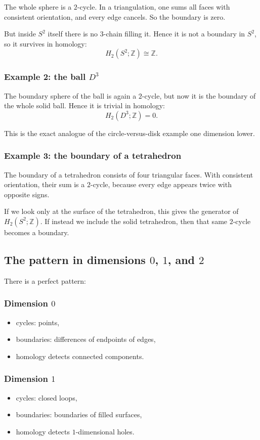 \documentclass[12pt,a4paper]{article}
\newcommand{\Z}{\mathbb{Z}}
\theoremstyle{notespace}
\begin{document}
The whole sphere is a \(2\)-cycle. In a triangulation, one sums all faces with consistent orientation, and every edge cancels. So the boundary is zero.

But inside \(S^2\) itself there is no \(3\)-chain filling it. Hence it is not a boundary in \(S^2\), so it survives in homology:
\[
H_2(S^2;\Z)\cong \Z.
\]

\subsubsection*{Example 2: the ball \(D^3\)}

The boundary sphere of the ball is again a \(2\)-cycle, but now it is the boundary of the whole solid ball. Hence it is trivial in homology:
\[
H_2(D^3;\Z)=0.
\]

This is the exact analogue of the circle-versus-disk example one dimension lower.

\subsubsection*{Example 3: the boundary of a tetrahedron}

The boundary of a tetrahedron consists of four triangular faces. With consistent orientation, their sum is a \(2\)-cycle, because every edge appears twice with opposite signs.

If we look only at the surface of the tetrahedron, this gives the generator of \(H_2(S^2;\Z)\). If instead we include the solid tetrahedron, then that same \(2\)-cycle becomes a boundary.

\subsection{The pattern in dimensions \(0\), \(1\), and \(2\)}

There is a perfect pattern:

\subsubsection*{Dimension \(0\)}
\begin{itemize}
	\item cycles: points,
	\item boundaries: differences of endpoints of edges,
	\item homology detects connected components.
\end{itemize}

\subsubsection*{Dimension \(1\)}
\begin{itemize}
	\item cycles: closed loops,
	\item boundaries: boundaries of filled surfaces,
	\item homology detects \(1\)-dimensional holes.
\end{itemize}
\end{document}
